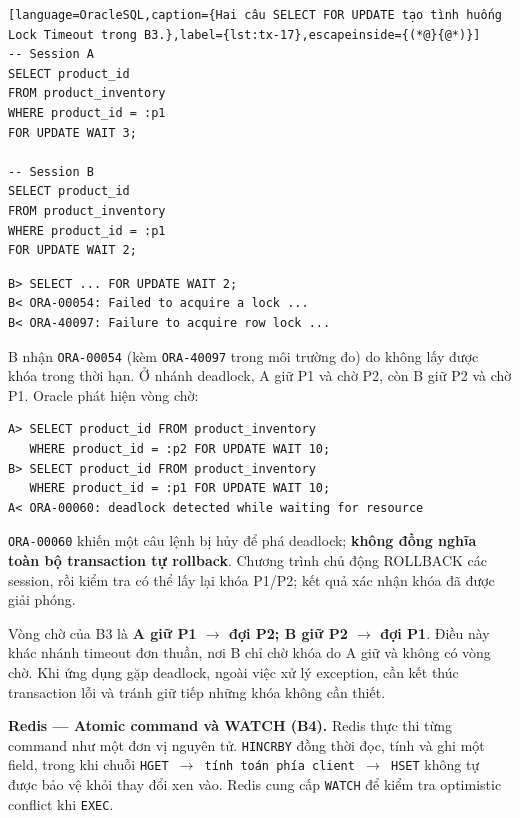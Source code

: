 \begin{lstlisting}[language=OracleSQL,caption={Hai câu SELECT FOR UPDATE tạo tình huống Lock Timeout trong B3.},label={lst:tx-17},escapeinside={(*@}{@*)}]
-- Session A
SELECT product_id
FROM product_inventory
WHERE product_id = :p1
FOR UPDATE WAIT 3;

-- Session B
SELECT product_id
FROM product_inventory
WHERE product_id = :p1
FOR UPDATE WAIT 2;
\end{lstlisting}

\begingroup
{}\label{result:tx-10}
\nopagebreak[4]
\begin{Verbatim}
B> SELECT ... FOR UPDATE WAIT 2;
B< ORA-00054: Failed to acquire a lock ...
B< ORA-40097: Failure to acquire row lock ...
\end{Verbatim}
\endgroup\par\smallskip
B nhận \texttt{ORA-\allowbreak{}00054} (kèm \texttt{ORA-\allowbreak{}40097} trong môi trường đo) do không lấy được khóa trong thời hạn. Ở nhánh deadlock, A giữ P1 và chờ P2, còn B giữ P2 và chờ P1. Oracle phát hiện vòng chờ:

\begingroup
{}\label{result:tx-11}
\nopagebreak[4]
\begin{Verbatim}
A> SELECT product_id FROM product_inventory
   WHERE product_id = :p2 FOR UPDATE WAIT 10;
B> SELECT product_id FROM product_inventory
   WHERE product_id = :p1 FOR UPDATE WAIT 10;
A< ORA-00060: deadlock detected while waiting for resource
\end{Verbatim}
\endgroup\par\smallskip
\texttt{ORA-\allowbreak{}00060} khiến một câu lệnh bị hủy để phá deadlock; \textbf{không đồng nghĩa toàn bộ transaction tự rollback}. Chương trình chủ động ROLLBACK các session, rồi kiểm tra có thể lấy lại khóa P1/P2; kết quả xác nhận khóa đã được giải phóng.

Vòng chờ của B3 là \textbf{A giữ P1 \(\rightarrow\) đợi P2; B giữ P2 \(\rightarrow\) đợi P1}. Điều này khác nhánh timeout đơn thuần, nơi B chỉ chờ khóa do A giữ và không có vòng chờ. Khi ứng dụng gặp deadlock, ngoài việc xử lý exception, cần kết thúc transaction lỗi và tránh giữ tiếp những khóa không cần thiết.

\textbf{Redis — Atomic command và WATCH (B4).} Redis thực thi từng command như một đơn vị nguyên tử. \texttt{HINCRBY} đồng thời đọc, tính và ghi một field, trong khi chuỗi \texttt{HGET \(\rightarrow\) tính toán phía client \(\rightarrow\) HSET} không tự được bảo vệ khỏi thay đổi xen vào. Redis cung cấp \texttt{WATCH} để kiểm tra optimistic conflict khi \texttt{EXEC}.


